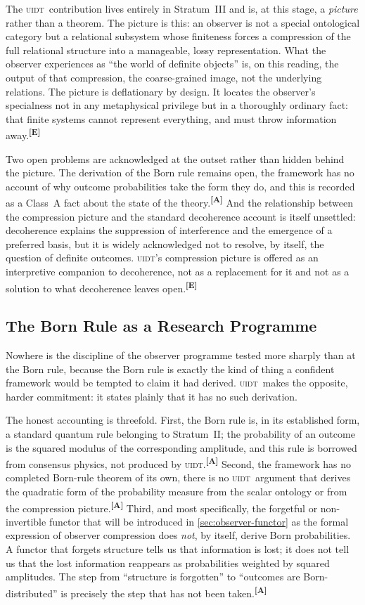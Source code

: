 \documentclass[12pt,a4paper,twoside]{article}
\theoremstyle{plain}
\theoremstyle{definition}
\theoremstyle{remark}
\newcommand{\UIDT}{\textsc{uidt}}
\newcommand{\catmark}[1]{\textsuperscript{\textsf{\textbf{[#1]}}}}
\begin{document}
\noindent The \UIDT\ contribution lives entirely in Stratum~III and is, at this stage, a \emph{picture} rather than a theorem. The picture is this: an observer is not a special ontological category but a relational subsystem whose finiteness forces a compression of the full relational structure into a manageable, lossy representation. What the observer experiences as ``the world of definite objects'' is, on this reading, the output of that compression, the coarse-grained image, not the underlying relations. The picture is deflationary by design. It locates the observer's specialness not in any metaphysical privilege but in a thoroughly ordinary fact: that finite systems cannot represent everything, and must throw information away.\catmark{E}

Two open problems are acknowledged at the outset rather than hidden behind the picture. The derivation of the Born rule remains open, the framework has no account of why outcome probabilities take the form they do, and this is recorded as a Class~A fact about the state of the theory.\catmark{A} And the relationship between the compression picture and the standard decoherence account is itself unsettled: decoherence explains the suppression of interference and the emergence of a preferred basis, but it is widely acknowledged not to resolve, by itself, the question of definite outcomes. \UIDT's compression picture is offered as an interpretive companion to decoherence, not as a replacement for it and not as a solution to what decoherence leaves open.\catmark{E}

\subsection{The Born Rule as a Research Programme}
\label{subsec:born-rule}

Nowhere is the discipline of the observer programme tested more sharply than at the Born rule, because the Born rule is exactly the kind of thing a confident framework would be tempted to claim it had derived. \UIDT\ makes the opposite, harder commitment: it states plainly that it has no such derivation.

The honest accounting is threefold. First, the Born rule is, in its established form, a standard quantum rule belonging to Stratum~II; the probability of an outcome is the squared modulus of the corresponding amplitude, and this rule is borrowed from consensus physics, not produced by \UIDT.\catmark{A} Second, the framework has no completed Born-rule theorem of its own, there is no \UIDT\ argument that derives the quadratic form of the probability measure from the scalar ontology or from the compression picture.\catmark{A} Third, and most specifically, the forgetful or non-invertible functor that will be introduced in \cref{sec:observer-functor} as the formal expression of observer compression does \emph{not}, by itself, derive Born probabilities. A functor that forgets structure tells us that information is lost; it does not tell us that the lost information reappears as probabilities weighted by squared amplitudes. The step from ``structure is forgotten'' to ``outcomes are Born-distributed'' is precisely the step that has not been taken.\catmark{A}
\end{document}
